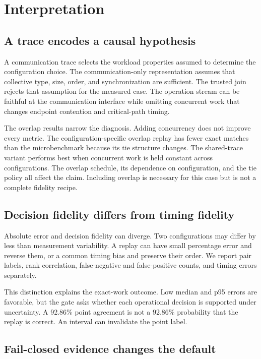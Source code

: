 \documentclass[10pt,twocolumn]{article}
\begin{document}
\section{Interpretation}

\subsection{A trace encodes a causal hypothesis}

A communication trace selects the workload properties assumed to determine
the configuration choice. The communication-only representation assumes that
collective type, size, order, and synchronization are sufficient. The trusted
join rejects that assumption for the measured case. The operation stream can
be faithful at the communication interface while omitting concurrent work that
changes endpoint contention and critical-path timing.

The overlap results narrow the diagnosis. Adding concurrency does not improve
every metric. The configuration-specific overlap replay has fewer exact matches
than the microbenchmark because its tie structure changes. The shared-trace
variant performs best when concurrent work is held constant across
configurations. The overlap schedule, its dependence on configuration, and the
tie policy all affect the claim. Including overlap is necessary for this case
but is not a complete fidelity recipe.

\subsection{Decision fidelity differs from timing fidelity}

Absolute error and decision fidelity can diverge. Two configurations may differ
by less than measurement variability. A replay can have small percentage error
and reverse them, or a common timing bias and preserve their order. We report
pair labels, rank correlation, false-negative and false-positive counts, and
timing errors separately.

This distinction explains the exact-work outcome. Low median and p95 errors are
favorable, but the gate asks whether each operational decision is supported
under uncertainty. A 92.86\% point agreement is not a 92.86\% probability that
the replay is correct. An interval can invalidate the point label.

\subsection{Fail-closed evidence changes the default}
\end{document}
